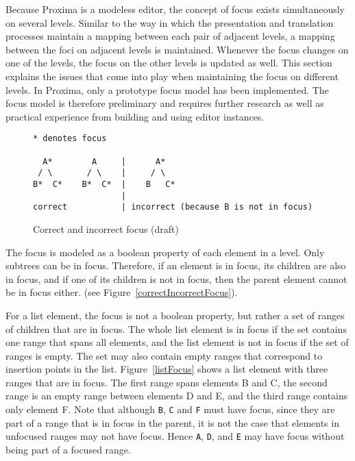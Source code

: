 


Because Proxima is a modeless editor, the concept of focus exists simultaneously on several levels.  Similar to the way in which the presentation and translation processes maintain a mapping between each pair of adjacent levels, a mapping between the foci on adjacent levels is maintained. Whenever the focus changes on one of the levels, the focus on the other levels is updated as well. This section explains the issues that come into play when maintaining the focus on different levels. In Proxima, only a prototype focus model has been implemented. The focus model is therefore preliminary and requires further research as well as practical experience from building and using editor instances. 

\begin{figure}
\begin{small}
\begin{center}
\begin{verbatim}
* denotes focus

  A*        A     |      A*
 / \       / \    |     / \
B*  C*    B*  C*  |    B   C*
                  |
correct           | incorrect (because B is not in focus)
\end{verbatim}
\caption{Correct and incorrect focus (draft)}\label{correctIncorrect focus} 
\end{center}
\end{small}
\end{figure}


The focus is modeled as a boolean property of each element in a level. Only subtrees can be in focus. Therefore, if an element is in focus, its children are also in focus, and if one of its children is not in focus, then the parent element cannot be in focus either. (see Figure~\ref{correctIncorrectFocus}). 

For a list element, the focus is not a boolean property, but rather a set of ranges of children that are in focus. The whole list element is in focus if the set contains one range that spans all elements, and the list element is not in focus if the set of ranges is empty. The set may also contain empty ranges that correspond to insertion points in the list. Figure~\ref{listFocus} shows a list element with three ranges that are in focus. The first range spans elements B and C, the second range is an empty range between elements D and E, and the third range contains only element F. Note that although \verb|B|, \verb|C| and \verb|F| must have focus, since they are part of a range that is in focus in the parent, it is not the case that elements in unfocused ranges may not have focus. Hence \verb|A|, \verb|D|, and \verb|E| may have focus without being part of a focused range.

